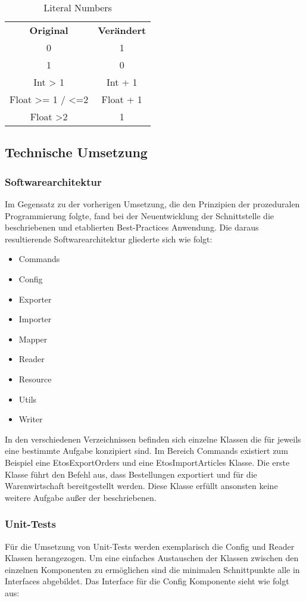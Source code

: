 \begin{table}[H]
	\caption{Literal Numbers}
	\begin{tabular}{cc}
		\textbf{Original} & \textbf{Verändert} \\
		0 & 1 \\
		1 & 0 \\
		Int > 1 & Int + 1 \\
		Float >= 1 / <=2 & Float + 1 \\
		Float >2 & 1 \\
	\end{tabular}
\end{table}

\subsection{Technische Umsetzung}
\subsubsection{Softwarearchitektur}
Im Gegensatz zu der vorherigen Umsetzung, die den Prinzipien der prozeduralen Programmierung folgte, fand bei der Neuentwicklung der Schnittstelle die beschriebenen und etablierten Best-Practices Anwendung. Die daraus resultierende Softwarearchitektur gliederte sich wie folgt:

\begin{itemize}
	\item Commands
	\item Config
	\item Exporter
	\item Importer
	\item Mapper
	\item Reader
	\item Resource
	\item Utils
	\item Writer
\end{itemize}

In den verschiedenen Verzeichnissen befinden sich einzelne Klassen die für jeweils eine bestimmte Aufgabe konzipiert sind. Im Bereich Commands existiert zum Beispiel eine EtosExportOrders und eine EtosImportArticles Klasse. Die erste Klasse führt den Befehl aus, dass Bestellungen exportiert und für die Warenwirtschaft bereitgestellt werden. Diese Klasse erfüllt ansonsten keine weitere Aufgabe außer der beschriebenen.

\subsubsection{Unit-Tests}
Für die Umsetzung von Unit-Tests werden exemplarisch die Config und Reader Klassen herangezogen. Um eine einfaches Austauschen der Klassen zwischen den einzelnen Komponenten zu ermöglichen sind die minimalen Schnittpunkte alle in Interfaces abgebildet. Das Interface für die Config Komponente sieht wie folgt aus:

